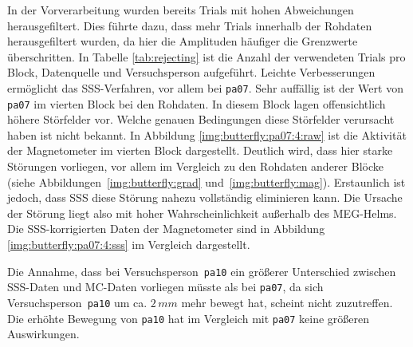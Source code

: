 \documentclass[doc,a4paper,12pt]{apa6}
\begin{document}
In der Vorverarbeitung wurden bereits Trials mit hohen Abweichungen herausgefiltert. Dies führte dazu, dass mehr Trials innerhalb der Rohdaten herausgefiltert wurden, da hier die Amplituden häufiger die Grenzwerte überschritten. In Tabelle \ref{tab:rejecting} ist die Anzahl der verwendeten Trials pro Block, Datenquelle und Versuchsperson aufgeführt. Leichte Verbesserungen ermöglicht das SSS-Verfahren, vor allem bei \texttt{pa07}. Sehr auffällig ist der Wert von \texttt{pa07} im vierten Block bei den Rohdaten. In diesem Block lagen offensichtlich höhere Störfelder vor. Welche genauen Bedingungen diese Störfelder verursacht haben ist nicht bekannt. In Abbildung \ref{img:butterfly:pa07:4:raw} ist die Aktivität der Magnetometer im vierten Block dargestellt. Deutlich wird, dass hier starke Störungen vorliegen, vor allem im Vergleich zu den Rohdaten anderer Blöcke (siehe Abbildungen~\ref{img:butterfly:grad} und~\ref{img:butterfly:mag}). Erstaunlich ist jedoch, dass SSS diese Störung nahezu vollständig eliminieren kann. Die Ursache der Störung liegt also mit hoher Wahrscheinlichkeit außerhalb des MEG-Helms. Die SSS-korrigierten Daten der Magnetometer sind in Abbildung \ref{img:butterfly:pa07:4:sss} im Vergleich dargestellt.

Die Annahme, dass bei Versuchsperson~\texttt{pa10} ein größerer Unterschied zwischen SSS-Daten und MC-Daten vorliegen müsste als bei \texttt{pa07}, da sich Versuchsperson~\texttt{pa10} um ca. $2\,mm$ mehr bewegt hat, scheint nicht zuzutreffen. Die erhöhte Bewegung von \texttt{pa10} hat im Vergleich mit \texttt{pa07} keine größeren Auswirkungen. 
\end{document}
